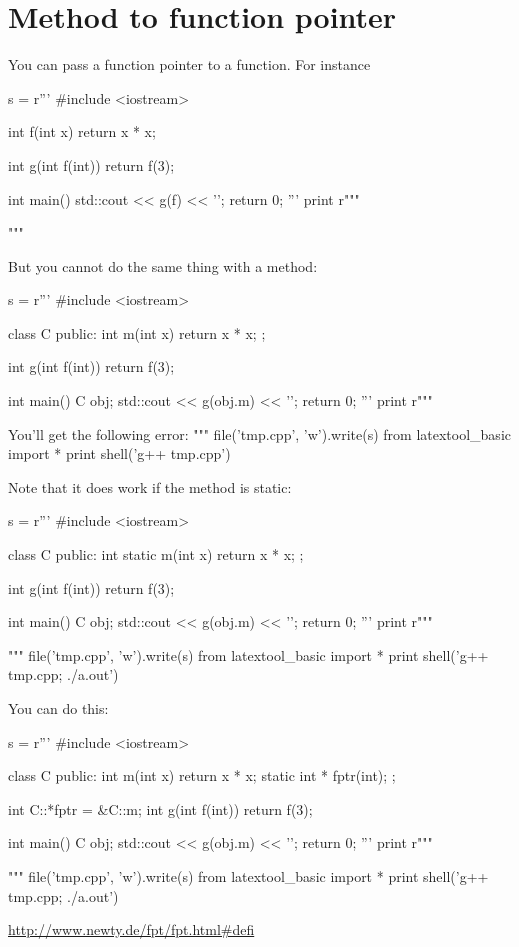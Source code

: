 \section{Method to function pointer}

You can pass a function pointer to a function.
For instance
\begin{python}
s = r'''
#include <iostream>

int f(int x)
{
    return x * x;
}

int g(int f(int))
{
    return f(3);
}

int main()
{
    std::cout << g(f) << '\n';
    return 0;
}
'''
print r"""
{\small
\begin{console}
\end{console}
}
""" %
\end{python}
But you cannot do the same thing with a method:
\begin{python}
s = r'''
#include <iostream>

class C
{
public:
    int m(int x)
    {
        return x * x;
    }
};

int g(int f(int))
{
    return f(3);
}

int main()
{
    C obj;
    std::cout << g(obj.m) << '\n';
    return 0;
}
'''
print r"""
{\small
\begin{console}
\end{console}
}

You'll get the following error:
""" %
file('tmp.cpp', 'w').write(s)
from latextool_basic import *
print shell('g++ tmp.cpp')
\end{python}
Note that it does work if the method is static:
\begin{python}
s = r'''
#include <iostream>

class C
{
public:
    int static m(int x)
    {
        return x * x;
    }
};

int g(int f(int))
{
    return f(3);
}

int main()
{
    C obj;
    std::cout << g(obj.m) << '\n';
    return 0;
}
'''
print r"""
{\small
\begin{console}
\end{console}
}
""" %
file('tmp.cpp', 'w').write(s)
from latextool_basic import *
print shell('g++ tmp.cpp; ./a.out')
\end{python}



You can do this:
\begin{python}
s = r'''
#include <iostream>

class C
{
public:
    int m(int x)
    {
        return x * x;
    }
    static int * fptr(int); 
};

int C::*fptr = &C::m;
int g(int f(int))
{
    return f(3);
}

int main()
{
    C obj;
    std::cout << g(obj.m) << '\n';
    return 0;
}
'''
print r"""
{\small
\begin{console}
\end{console}
}
""" %
file('tmp.cpp', 'w').write(s)
from latextool_basic import *
print shell('g++ tmp.cpp; ./a.out')

\end{python}


\url{http://www.newty.de/fpt/fpt.html#defi}
